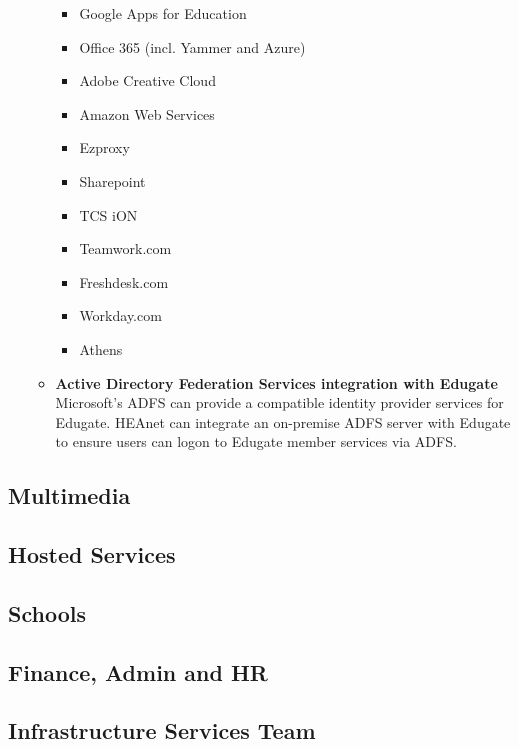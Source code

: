 \documentclass{article}
\begin{document}
\begin{itemize}
\begin{itemize}
\begin{itemize}
	      	      	\item Google Apps for Education
	      	      	\item Office 365 (incl. Yammer and Azure)
	      	      	\item Adobe Creative Cloud
	      	      	\item Amazon Web Services
	      	      	\item Ezproxy
	      	      	\item Sharepoint
	      	      	\item TCS iON
	      	      	\item Teamwork.com
	      	      	\item Freshdesk.com
	      	      	\item Workday.com
	      	      	\item Athens
	      	      	      	      		
	      	      \end{itemize}
	      	\item \textbf{Active Directory Federation Services integration with Edugate}\\
	      	      Microsoft's ADFS can provide a compatible identity provider services for Edugate. HEAnet can integrate an on-premise ADFS server with Edugate to ensure users can logon to Edugate member services via ADFS.
	      \end{itemize}
\end{itemize}
\subsection{Multimedia}
\subsection{Hosted Services}
\subsection{Schools}
\subsection{Finance, Admin and HR}
\subsection{Infrastructure Services Team}
\end{document}
